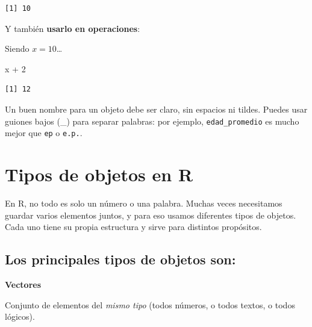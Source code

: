 \documentclass[
  letterpaper,
  DIV=11,
  numbers=noendperiod,
  twoside]{scrreprt}
\newenvironment{Shaded}{\begin{snugshade}}{\end{snugshade}}
\newcommand{\DecValTok}[1]{\textcolor[rgb]{0.68,0.00,0.00}{#1}}
\newcommand{\NormalTok}[1]{\textcolor[rgb]{0.00,0.23,0.31}{#1}}
\newcommand{\SpecialCharTok}[1]{\textcolor[rgb]{0.37,0.37,0.37}{#1}}
\begin{document}
\begin{verbatim}
[1] 10
\end{verbatim}

Y también \textbf{usarlo en operaciones}:

Siendo \(x = 10\)\ldots{}

\begin{Shaded}
\begin{Highlighting}[]
\NormalTok{x }\SpecialCharTok{+} \DecValTok{2}
\end{Highlighting}
\end{Shaded}

\begin{verbatim}
[1] 12
\end{verbatim}

\begin{tcolorbox}[enhanced jigsaw, titlerule=0mm, title=\textcolor{quarto-callout-tip-color}{\faLightbulb}\hspace{0.5em}{Consejo}, colback=white, opacityback=0, breakable, toprule=.15mm, left=2mm, leftrule=.75mm, colframe=quarto-callout-tip-color-frame, bottomtitle=1mm, rightrule=.15mm, opacitybacktitle=0.6, coltitle=black, arc=.35mm, bottomrule=.15mm, toptitle=1mm, colbacktitle=quarto-callout-tip-color!10!white]

Un buen nombre para un objeto debe ser claro, sin espacios ni tildes.
Puedes usar guiones bajos (\_) para separar palabras: por ejemplo,
\texttt{edad\_promedio} es mucho mejor que \texttt{ep} o \texttt{e.p.}.

\end{tcolorbox}

\section{Tipos de objetos en R}\label{tipos-de-objetos-en-r}

En R, no todo es solo un número o una palabra. Muchas veces necesitamos
guardar varios elementos juntos, y para eso usamos diferentes tipos de
objetos. Cada uno tiene su propia estructura y sirve para distintos
propósitos.

\subsection{Los principales tipos de objetos
son:}\label{los-principales-tipos-de-objetos-son}

\textbf{Vectores}

Conjunto de elementos del \emph{mismo tipo} (todos números, o todos
textos, o todos lógicos).
\end{document}
